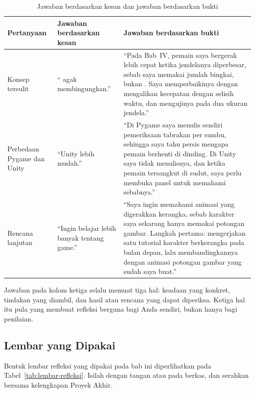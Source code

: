 \begin{table}[htbp]
\centering
\caption{Jawaban berdasarkan kesan dan jawaban berdasarkan bukti}
\label{tab:refleksi-bukti}
{\setlength{\tabcolsep}{4pt}\footnotesize%
\begin{tabularx}{\textwidth}{@{}L{4.2cm} Y Y@{}}
\toprule
\headrow \textbf{Pertanyaan} & \textbf{Jawaban berdasarkan kesan} & \textbf{Jawaban berdasarkan bukti} \\
\midrule
Konsep tersulit &
`` agak membingungkan.'' &
``Pada Bab~IV, pemain saya bergerak lebih cepat ketika jendelanya diperbesar,
sebab saya memakai jumlah bingkai, bukan . Saya
memperbaikinya dengan mengalikan kecepatan dengan selisih waktu, dan
mengujinya pada dua ukuran jendela.'' \\
\addlinespace
Perbedaan Pygame dan Unity &
``Unity lebih mudah.'' &
``Di Pygame saya menulis sendiri pemeriksaan tabrakan per sumbu, sehingga saya
tahu persis mengapa pemain berhenti di dinding. Di Unity saya tidak menulisnya,
dan ketika pemain tersangkut di sudut, saya perlu membuka panel
 untuk memahami sebabnya.'' \\
\addlinespace
Rencana lanjutan &
``Ingin belajar lebih banyak tentang game.'' &
``Saya ingin memahami animasi yang digerakkan kerangka, sebab karakter saya
sekarang hanya memakai potongan gambar. Langkah pertama: mengerjakan satu
tutorial karakter berkerangka pada bulan depan, lalu membandingkannya dengan
animasi potongan gambar yang sudah saya buat.'' \\
\bottomrule
\end{tabularx}}
\end{table}

Jawaban pada kolom ketiga selalu memuat tiga hal: keadaan
yang konkret, tindakan yang diambil, dan hasil atau rencana yang dapat
diperiksa. Ketiga hal itu pula yang membuat refleksi berguna bagi Anda
sendiri, bukan hanya bagi penilaian.

\subsection{Lembar yang Dipakai}

Bentuk lembar refleksi yang dipakai pada bab ini diperlihatkan pada
Tabel~\ref{tab:lembar-refleksi}. Isilah dengan tangan atau pada berkas, dan
serahkan bersama kelengkapan Proyek Akhir.

